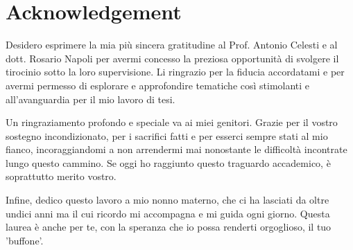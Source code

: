 \chapter*{Acknowledgement}
Desidero esprimere la mia più sincera gratitudine al Prof. Antonio Celesti e al dott. Rosario Napoli per avermi concesso la preziosa opportunità di svolgere il tirocinio sotto la loro supervisione. Li ringrazio per la fiducia accordatami e per avermi permesso di esplorare e approfondire tematiche così stimolanti e all'avanguardia per il mio lavoro di tesi.

Un ringraziamento profondo e speciale va ai miei genitori. Grazie per il vostro sostegno incondizionato, per i sacrifici fatti e per esserci sempre stati al mio fianco, incoraggiandomi a non arrendermi mai nonostante le difficoltà incontrate lungo questo cammino. Se oggi ho raggiunto questo traguardo accademico, è soprattutto merito vostro.

Infine, dedico questo lavoro a mio nonno materno, che ci ha lasciati da oltre undici anni ma il cui ricordo mi accompagna e mi guida ogni giorno. Questa laurea è anche per te, con la speranza che io possa renderti orgoglioso, il tuo 'buffone'.